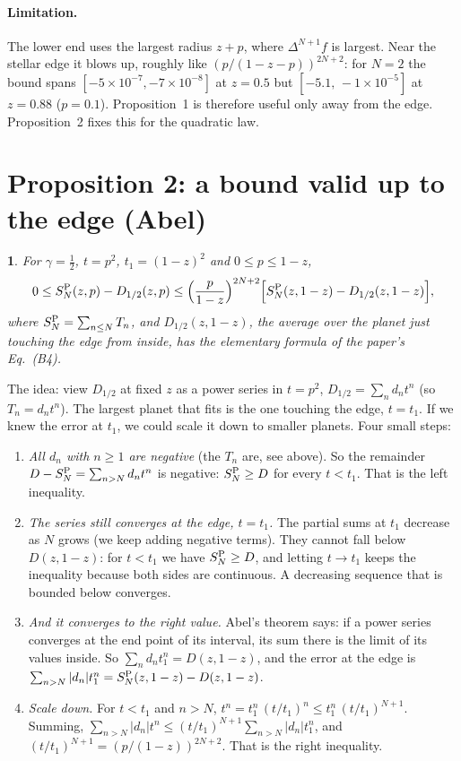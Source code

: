 \documentclass[11pt,a4paper]{article}
\newtheorem*{paperthm}{\paperthmname}
\newcommand{\paperthmname}{}
\theoremstyle{remark}
\begin{document}
\paragraph{Limitation.} The lower end uses the largest radius $z+p$, where $\Delta^{N+1}f$ is
largest. Near the stellar edge it blows up, roughly like $(p/(1-z-p))^{2N+2}$: for $N=2$ the bound
spans $[-5\times10^{-7},-7\times10^{-8}]$ at $z=0.5$ but $[-5.1,\,-1\times10^{-5}]$ at $z=0.88$
($p=0.1$). Proposition~1 is therefore useful only away from the edge. Proposition~2 fixes this for
the quadratic law.

\section{Proposition 2: a bound valid up to the edge (Abel)}

\renewcommand{\paperthmname}{Proposition 2 (as in the paper)}
\begin{paperthm}
For $\gamma=\tfrac12$, $t=p^2$, $t_1=(1-z)^2$ and $0\le p\le1-z$,
\[
  0\le S^{\rm P}_N(z,p)-D_{1/2}(z,p)\le\Bigl(\frac{p}{1-z}\Bigr)^{2N+2}
  \Bigl[S^{\rm P}_N(z,1-z)-D_{1/2}(z,1-z)\Bigr],
\]
where $S^{\rm P}_N=\sum_{n\le N}T_n$, and $D_{1/2}(z,1-z)$, the average over the planet just
touching the edge from inside, has the elementary formula of the paper's Eq.~(B4).
\end{paperthm}

The idea: view $D_{1/2}$ at fixed $z$ as a power series in $t=p^2$,
$D_{1/2}=\sum_nd_nt^n$ (so $T_n=d_nt^n$). The largest planet that fits is the one touching the
edge, $t=t_1$. If we knew the error at $t_1$, we could scale it down to smaller planets. Four small
steps:

\begin{enumerate}
  \item \emph{All $d_n$ with $n\ge1$ are negative} (the $T_n$ are, see above). So the remainder
        $D-S^{\rm P}_N=\sum_{n>N}d_nt^n$ is negative: $S^{\rm P}_N\ge D$ for every $t<t_1$.
        That is the left inequality.
  \item \emph{The series still converges at the edge, $t=t_1$.} The partial sums at $t_1$ decrease
        as $N$ grows (we keep adding negative terms). They cannot fall below $D(z,1-z)$: for
        $t<t_1$ we have $S^{\rm P}_N\ge D$, and letting $t\to t_1$ keeps the inequality because
        both sides are continuous. A decreasing sequence that is bounded below converges.
  \item \emph{And it converges to the right value.} Abel's theorem says: if a power series converges
        at the end point of its interval, its sum there is the limit of its values inside. So
        $\sum_nd_nt_1^n=D(z,1-z)$, and the error at the edge is
        $\sum_{n>N}|d_n|t_1^n=S^{\rm P}_N(z,1-z)-D(z,1-z)$.
  \item \emph{Scale down.} For $t<t_1$ and $n>N$, $t^n=t_1^n\,(t/t_1)^n\le t_1^n\,(t/t_1)^{N+1}$.
        Summing, $\sum_{n>N}|d_n|t^n\le(t/t_1)^{N+1}\sum_{n>N}|d_n|t_1^n$, and
        $(t/t_1)^{N+1}=(p/(1-z))^{2N+2}$. That is the right inequality.
\end{enumerate}
\end{document}
